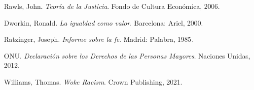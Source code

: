 \documentclass[12pt]{article}
\begin{document}
\begin{thebibliography}{9}

Rawls, John.
\textit{Teoría de la Justicia}. Fondo de Cultura Económica, 2006.

Dworkin, Ronald.
\textit{La igualdad como valor}. Barcelona: Ariel, 2000.

Ratzinger, Joseph.
\textit{Informe sobre la fe}. Madrid: Palabra, 1985.

ONU.
\textit{Declaración sobre los Derechos de las Personas Mayores}. Naciones Unidas, 2012.

Williams, Thomas.
\textit{Woke Racism}. Crown Publishing, 2021.

\end{thebibliography}
\end{document}

